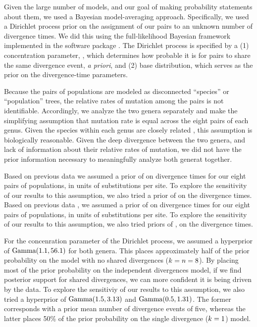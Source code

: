 Given the large number of models, and our goal of making probability statements
about them, we used a Bayesian model-averaging approach.
Specifically, we used a Dirichlet process prior on the assignment of our
pairs to an unknown number of divergence times.
We did this using the full-likelihood Bayesian framework implemented in the
software package \ecoevolity \citep{Oaks2018ecoevolity}.
The Dirichlet process is specified by a
(1) concentration parameter, \concentration, which determines how probable it
is for pairs to share the same divergence event, \emph{a priori}, and
(2) base distribution, which serves as the prior on the divergence-time
parameters.

Because the pairs of populations are modeled as disconnected ``species'' or
``population'' trees, the relative rates of mutation among the pairs is not
identifiable.
Accordingly, we analyze the two genera separately and make the simplifying
assumption that mutation rate is equal across the eight pairs of each genus.
Given the species within each genus are closely related \citep{Welton2010,
    Welton2010zootaxa, Siler2010, Siler2012, Siler2014kikuchii}, this
assumption is biologically reasonable.
Given the deep divergence between the two genera, and lack of information about
their relative rates of mutation, we did not have the prior information
necessary to meaningfully analyze both generat together.

Based on previous data \citep{Welton2010, Welton2010zootaxa, Siler2010} we
assumed a prior of  on divergence times for our eight pairs
of  populations, in units of substitutions per site.
To explore the sensitivity of our results to this assumption, we also
tried a prior of  on the divergence times.
Based on previous data \citep{Siler2012, Siler2014kikuchii}, we assumed a prior
of  on divergence times for our eight pairs of 
populations, in units of substitutions per site.
To explore the sensitivity of our results to this assumption, we also tried
priors of ,  on the 
divergence times.

For the concenration parameter of the Dirichlet process, we assumed
a hyperprior of $\textrm{Gamma}(1.1, 56.1)$ for both genera.
This places approximately half of the prior probability on the model
with no shared divergences ($k_{} = n = 8$).
By placing most of the prior probability on the independent divergences model,
if we find posterior support for shared divergences, we can more confident it
is being driven by the data.
To explore the sensitiviy of our results to this assumption, we also
tried a hyperprior of
$\textrm{Gamma}(1.5, 3.13)$
and
$\textrm{Gamma}(0.5, 1.31)$.
The former corresponds with a prior mean number of divergence events of five,
whereas the latter places 50\% of the prior probability on the single
divergence ($k_{} = 1$) model.

